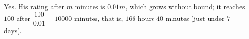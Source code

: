 Yes. His rating after $m$ minutes is $0.01m$, which grows without bound; it reaches $100$ after $\dfrac{100}{0.01}=\boxed{10000\text{ minutes}}$, that is, $166$ hours $40$ minutes (just under $7$ days).
